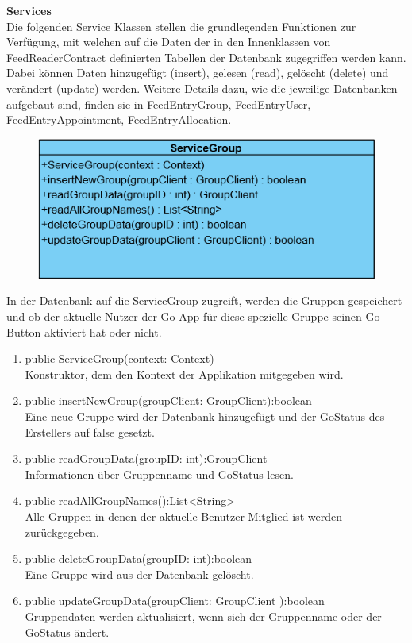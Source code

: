 \textbf{Services}\\
Die folgenden Service Klassen stellen die grundlegenden Funktionen zur Verfügung, mit welchen auf die Daten der in den Innenklassen von FeedReaderContract definierten Tabellen der Datenbank zugegriffen werden kann. Dabei können Daten hinzugefügt (insert), gelesen (read), gelöscht (delete) und verändert (update) werden.
Weitere Details dazu, wie die jeweilige Datenbanken aufgebaut sind, finden sie in FeedEntryGroup, FeedEntryUser, FeedEntryAppointment, FeedEntryAllocation.

\begin{figure}[H]
	\includegraphics[scale = .6]{res/umlClasses/ServiceGroup.png}
	\centering
\end{figure}
In der Datenbank auf die ServiceGroup zugreift, werden die Gruppen gespeichert und ob der aktuelle Nutzer der Go-App für diese spezielle Gruppe seinen Go-Button aktiviert hat oder nicht. 
\begin{enumerate}
	\item public ServiceGroup(context: Context)\\
		Konstruktor, dem den Kontext der Applikation mitgegeben wird.
	\item public insertNewGroup(groupClient: GroupClient):boolean\\
		Eine neue Gruppe wird der Datenbank hinzugefügt und der GoStatus des Erstellers auf false gesetzt.
	\item public readGroupData(groupID: int):GroupClient \\
		Informationen über Gruppenname und GoStatus lesen. 
	\item public readAllGroupNames():List<String>\\
		Alle Gruppen in denen der aktuelle Benutzer Mitglied ist werden zurückgegeben.
	\item public deleteGroupData(groupID: int):boolean\\
		Eine Gruppe wird aus der Datenbank gelöscht.
	\item public updateGroupData(groupClient: GroupClient ):boolean\\
		Gruppendaten werden aktualisiert, wenn sich der Gruppenname oder der GoStatus ändert.
\end{enumerate}

